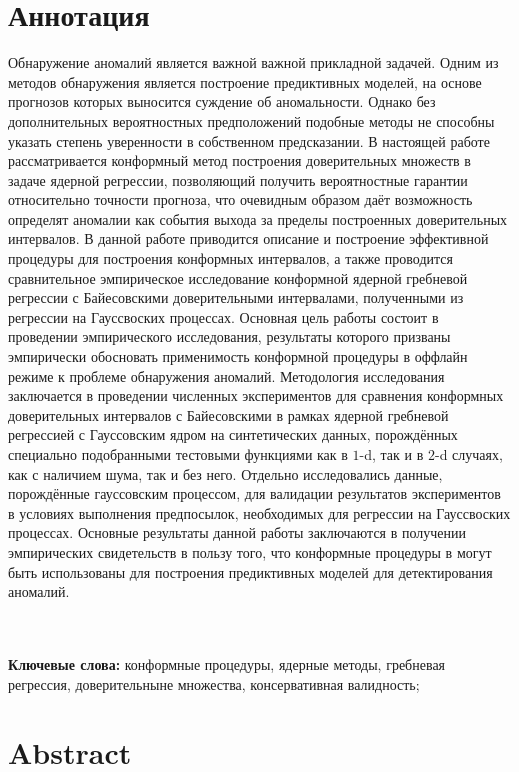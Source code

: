\documentclass[a4paper,14pt]{extarticle}
\begin{document}
\clearpage
{}
\section*{Аннотация}

Обнаружение аномалий является важной важной прикладной задачей. Одним из методов
обнаружения является построение предиктивных моделей, на основе прогнозов которых
выносится суждение об аномальности. Однако без дополнительных вероятностных предположений
подобные методы не способны указать степень уверенности в собственном предсказании.
В настоящей работе рассматривается конформный метод построения доверительных множеств
в задаче ядерной регрессии, позволяющий получить вероятностные гарантии относительно
точности прогноза, что очевидным образом даёт возможность определят аномалии как
события выхода за пределы построенных доверительных интервалов. В данной работе
приводится описание и построение эффективной процедуры для построения конформных
интервалов, а также проводится сравнительное эмпирическое исследование конформной
ядерной гребневой регрессии с Байесовскими доверительными интервалами, полученными
из регрессии на Гауссвоских процессах.
Основная цель работы состоит в проведении эмпирического исследования, результаты
которого призваны эмпирически обосновать применимость конформной процедуры в оффлайн
режиме к проблеме обнаружения аномалий. Методология исследования заключается в проведении
численных экспериментов для сравнения конформных доверительных интервалов с Байесовскими
в рамках ядерной гребневой регрессией с Гауссовским ядром на синтетических данных,
порождённых специально подобранными тестовыми функциями как в $1$-d, так и в $2$-d
случаях, как с наличием шума, так и без него. Отдельно исследовались данные, порождённые
гауссовским процессом, для валидации результатов экспериментов в условиях выполнения
предпосылок, необходимых для регрессии на Гауссвоских процессах.
Основные результаты данной работы заключаются в получении эмпирических свидетельств
в пользу того, что конформные процедуры в могут быть использованы для построения
предиктивных моделей для детектирования аномалий.

\hfill\\\hfill\\
\noindent\textbf{Ключевые слова:} конформные процедуры, ядерные методы, гребневая регрессия,
доверительныне множества, консервативная валидность;

\clearpage
{}
\section*{Abstract}
\end{document}
